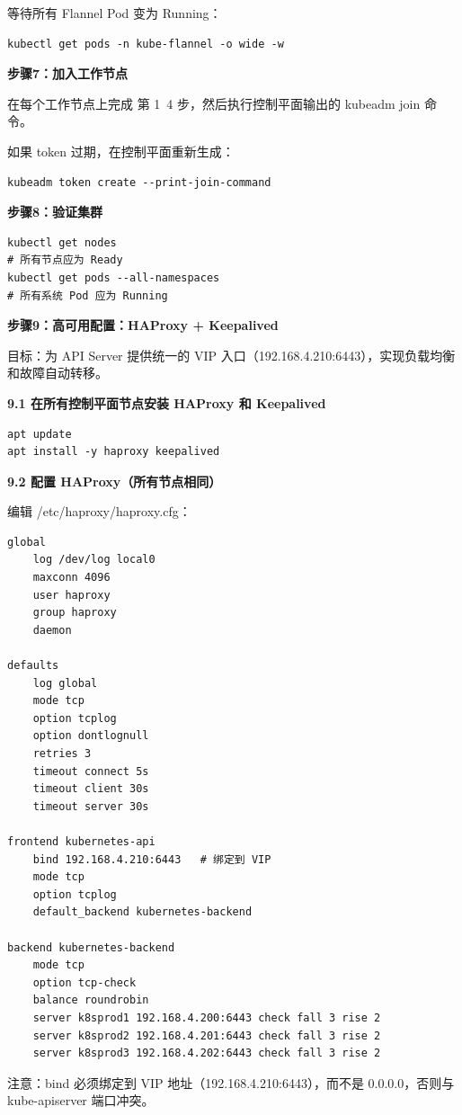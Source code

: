 \documentclass[12pt,UTF8]{ctexbook}
\begin{document}
等待所有 Flannel Pod 变为 Running：
\begin{lstlisting}
kubectl get pods -n kube-flannel -o wide -w
\end{lstlisting}

\textbf{步骤7：加入工作节点}

在每个工作节点上完成 第 1~4 步，然后执行控制平面输出的 kubeadm join 命令。

如果 token 过期，在控制平面重新生成：
\begin{lstlisting}
kubeadm token create --print-join-command
\end{lstlisting}

\textbf{步骤8：验证集群}

\begin{lstlisting}
kubectl get nodes
# 所有节点应为 Ready
kubectl get pods --all-namespaces
# 所有系统 Pod 应为 Running
\end{lstlisting}

\textbf{步骤9：高可用配置：HAProxy + Keepalived}

目标：为 API Server 提供统一的 VIP 入口（192.168.4.210:6443），实现负载均衡和故障自动转移。

\textbf{9.1 在所有控制平面节点安装 HAProxy 和 Keepalived}

\begin{lstlisting}
apt update
apt install -y haproxy keepalived
\end{lstlisting}

\textbf{9.2 配置 HAProxy（所有节点相同）}

编辑 /etc/haproxy/haproxy.cfg：

\begin{lstlisting}
global
    log /dev/log local0
    maxconn 4096
    user haproxy
    group haproxy
    daemon

defaults
    log global
    mode tcp
    option tcplog
    option dontlognull
    retries 3
    timeout connect 5s
    timeout client 30s
    timeout server 30s

frontend kubernetes-api
    bind 192.168.4.210:6443   # 绑定到 VIP
    mode tcp
    option tcplog
    default_backend kubernetes-backend

backend kubernetes-backend
    mode tcp
    option tcp-check
    balance roundrobin
    server k8sprod1 192.168.4.200:6443 check fall 3 rise 2
    server k8sprod2 192.168.4.201:6443 check fall 3 rise 2
    server k8sprod3 192.168.4.202:6443 check fall 3 rise 2
\end{lstlisting}

注意：bind 必须绑定到 VIP 地址（192.168.4.210:6443），而不是 0.0.0.0，否则与 kube-apiserver 端口冲突。
\end{document}
